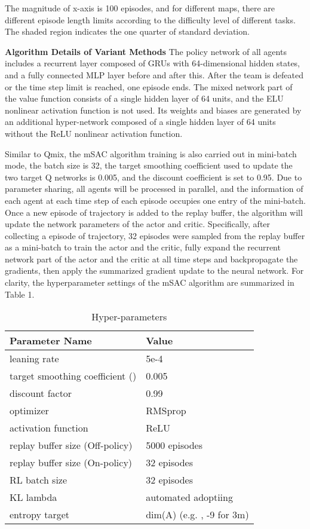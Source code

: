 \documentclass[runningheads]{llncs}
\begin{document}
The magnitude of x-axis is 100 episodes, and for different maps, there are different episode length limits according to the difficulty level of different tasks. The shaded region indicates the one  quarter of standard deviation.

{\bf Algorithm Details of Variant Methods}
The policy network of all agents includes a recurrent layer composed of GRUs with 64-dimensional hidden states, and a fully connected MLP layer before and after this. After the team is defeated or the time step limit is reached, one episode ends.
 The mixed network part of the value function consists of a single hidden layer of 64 units, and the ELU nonlinear activation function is not used. Its weights and biases are generated by an additional hyper-network composed of a single hidden layer of 64 units without the ReLU nonlinear activation function.
 
 Similar to Qmix, the mSAC algorithm training is also carried out in mini-batch mode, the batch size is 32, the target smoothing coefficient used to update the two target Q networks is 0.005, and the discount coefficient is set to 0.95.
 Due to parameter sharing, all agents will be processed in parallel, and the information of each agent at each time step of each episode occupies one entry of the mini-batch. Once a new episode of trajectory is added to the replay buffer, the algorithm will update the network parameters of the actor and critic.
 Specifically, after collecting a episode of trajectory, 32 episodes were sampled from the replay buffer as a mini-batch to train the actor and the critic, fully expand the recurrent network part of the actor and the critic at all time steps and backpropagate the gradients, then apply the summarized gradient update to the neural network. For clarity, the hyperparameter settings of the mSAC algorithm are summarized in Table 1.
 
 \begin{table}[!htbp]
	\centering
	\caption{Hyper-parameters}
	\begin{tabular}{ll}		
		\hline
		Parameter Name   & Value  \\
		\hline
		leaning rate      & 5e-4     \\
target smoothing coefficient () & 0.005\\
		discount factor          & 0.99        \\
		optimizer         & RMSprop      \\
		activation function   & ReLU      \\
		replay buffer size (Off-policy)    & 5000 episodes   \\
		replay buffer size (On-policy)     & 32 episodes   \\
RL batch size        & 32 episodes    \\		
		KL lambda & automated adoptiing \\
		entropy target & dim(A) (e.g. , -9 for 3m) \\
		
\hline
	\end{tabular}
	\label{tab:booktabs}
\end{table}
\end{document}
